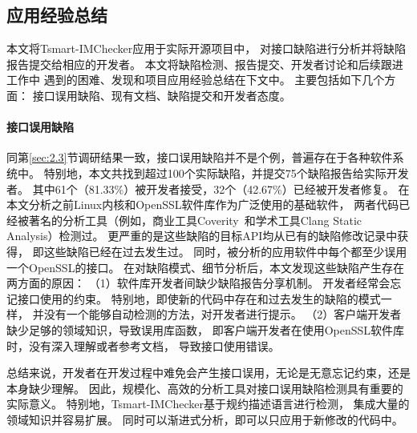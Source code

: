 \subsection{应用经验总结}
本文将Tsmart-IMChecker应用于实际开源项目中，
对接口缺陷进行分析并将缺陷报告提交给相应的开发者。
本文将缺陷检测、报告提交、开发者讨论和后续跟进工作中
遇到的困难、发现和项目应用经验总结在下文中。
主要包括如下几个方面：
接口误用缺陷、现有文档、缺陷提交和开发者态度。

\paragraph{接口误用缺陷}
同第\ref{sec:2.3}节调研结果一致，接口误用缺陷并不是个例，普遍存在于各种软件系统中。
特别地，本文共找到超过100个实际缺陷，并提交75个缺陷报告给实际开发者。
其中61个（81.33\%）被开发者接受，32个（42.67\%）已经被开发者修复。
在本文分析之前Linux内核和OpenSSL软件库作为广泛使用的基础软件，
两者代码已经被著名的分析工具（例如，商业工具Coverity~\cite{coverity}和学术工具Clang Static Analysis）检测过。
更严重的是这些缺陷的目标API均从已有的缺陷修改记录中获得，
即这些缺陷已经在过去发生过。
同时，被分析的应用软件中每个都至少误用一个OpenSSL的接口。
在对缺陷模式、细节分析后，本文发现这些缺陷产生存在两方面的原因：
（1）软件库开发者间缺少缺陷报告分享机制。
开发者经常会忘记接口使用的约束。
特别地，即使新的代码中存在和过去发生的缺陷的模式一样，
并没有一个能够自动检测的方法，对开发者进行提示。
（2）客户端开发者缺少足够的领域知识，导致误用库函数，
即客户端开发者在使用OpenSSL软件库时，没有深入理解或者参考文档，
导致接口使用错误。

总结来说，开发者在开发过程中难免会产生接口误用，无论是无意忘记约束，还是本身缺少理解。
因此，规模化、高效的分析工具对接口误用缺陷检测具有重要的实际意义。
特别地，Tsmart-IMChecker基于规约描述语言进行检测，
集成大量的领域知识并容易扩展。
同时可以渐进式分析，即可以只应用于新修改的代码中。

